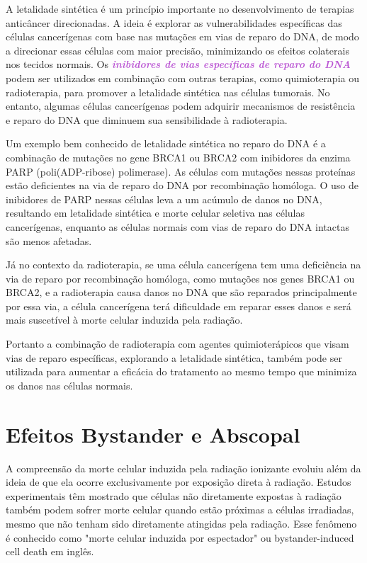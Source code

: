 \documentclass[11pt,a4paper]{article}
\newcounter{exemplo}
\begin{document}
	A letalidade sintética é um princípio importante no desenvolvimento de terapias anticâncer direcionadas. A ideia é explorar as vulnerabilidades específicas das células cancerígenas com base nas mutações em vias de reparo do DNA, de modo a direcionar essas células com maior precisão, minimizando os efeitos colaterais nos tecidos normais. Os \textcolor{MediumOrchid}{\textbf{\textit{inibidores de vias específicas de reparo do DNA}}} podem ser utilizados em combinação com outras terapias, como quimioterapia ou radioterapia, para promover a letalidade sintética nas células tumorais. No entanto, algumas células cancerígenas podem adquirir mecanismos de resistência e reparo do DNA que diminuem sua sensibilidade à radioterapia.

	Um exemplo bem conhecido de letalidade sintética no reparo do DNA é a combinação de mutações no gene BRCA1 ou BRCA2 com inibidores da enzima PARP (poli(ADP-ribose) polimerase).  As células com mutações nessas proteínas estão deficientes na via de reparo do DNA por recombinação homóloga. O uso de inibidores de PARP nessas células leva a um acúmulo de danos no DNA, resultando em letalidade sintética e morte celular seletiva nas células cancerígenas, enquanto as células normais com vias de reparo do DNA intactas são menos afetadas. 
	
	Já no contexto da radioterapia, se uma célula cancerígena tem uma deficiência na via de reparo por recombinação homóloga, como mutações nos genes BRCA1 ou BRCA2, e a radioterapia causa danos no DNA que são reparados principalmente por essa via, a célula cancerígena terá dificuldade em reparar esses danos e será mais suscetível à morte celular induzida pela radiação. 
	
	Portanto a combinação de radioterapia com agentes quimioterápicos que visam vias de reparo específicas, explorando a letalidade sintética, também pode ser utilizada para aumentar a eficácia do tratamento ao mesmo tempo que minimiza os danos nas células normais.

	\section{Efeitos Bystander e Abscopal}

	A compreensão da morte celular induzida pela radiação ionizante evoluiu além da ideia de que ela ocorre exclusivamente por exposição direta à radiação. Estudos experimentais têm mostrado que células não diretamente expostas à radiação também podem sofrer morte celular quando estão próximas a células irradiadas, mesmo que não tenham sido diretamente atingidas pela radiação. Esse fenômeno é conhecido como "morte celular induzida por espectador" ou bystander-induced cell death em inglês.
\end{document}

